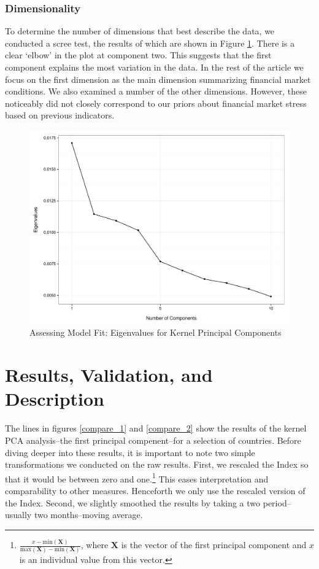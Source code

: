 \documentclass[]{article}
\begin{document}
\subsubsection{Dimensionality}\label{dimensionality}

To determine the number of dimensions that best describe the data, we
conducted a scree test, the results of which are shown in Figure
\ref{scree_plot}. There is a clear `elbow' in the plot at component two.
This suggests that the first component explains the most variation in the data. In the rest of the article we focus on the first dimension as the main dimension summarizing financial market conditions. We also examined a number of the other dimensions. However, these noticeably did not closely correspond to our priors about financial market stress based on previous indicators.

\begin{figure}
    \caption{Assessing Model Fit: Eigenvalues for Kernel Principal Components}
    \label{scree_plot}
    \begin{center}
        \includegraphics[scale=0.5]{analysis/figures/scree_plot.pdf}
    \end{center}
\end{figure}

\section{Results, Validation, and Description}\label{results}

The lines in figures \ref{compare_1} and \ref{compare_2} show the
results of the kernel PCA analysis--the first principal compenent--for a selection of countries. Before diving deeper into these results, it is important to note two simple transformations we conducted on the raw results. First, we rescaled the Index so that it
would be between zero and one.\footnote{\(\frac{x - \mathrm{min}(\bm{X})}{\mathrm{max}(\bm{X}) - \mathrm{min}(\bm{X})}\),
  where \(\bm{X}\) is the vector of the first principal component and
  \(x\) is an individual value from this vector.} This eases
interpretation and comparability to other measures. Henceforth we only
use the rescaled version of the Index. Second, we slightly smoothed the
results by taking a two period--usually two months--moving average.
\end{document}
